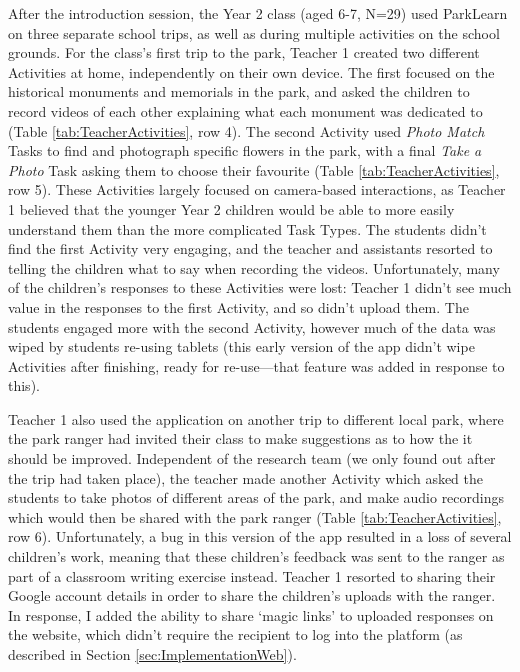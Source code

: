 After the introduction session, the Year 2 class (aged 6-7, N=29) used ParkLearn on three separate school trips, as well as during multiple activities on the school grounds. For the class's first trip to the park, Teacher 1 created two different Activities at home, independently on their own device. The first focused on the historical monuments and memorials in the park, and asked the children to record videos of each other explaining what each monument was dedicated to (Table \ref{tab:TeacherActivities}, row 4). The second Activity used \textit{Photo Match} Tasks to find and photograph specific flowers in the park, with a final \textit{Take a Photo} Task asking them to choose their favourite (Table \ref{tab:TeacherActivities}, row 5). These Activities largely focused on camera-based interactions, as Teacher 1 believed that the younger Year 2 children would be able to more easily understand them than the more complicated Task Types. The students didn't find the first Activity very engaging, and the teacher and assistants resorted to telling the children what to say when recording the videos. Unfortunately, many of the children's responses to these Activities were lost: Teacher 1 didn't see much value in the responses to the first Activity, and so didn't upload them. The students engaged more with the second Activity, however much of the data was wiped by students re-using tablets (this early version of the app didn't wipe Activities after finishing, ready for re-use---that feature was added in response to this).   

Teacher 1 also used the application on another trip to different local park, where the park ranger had invited their class to make suggestions as to how the it should be improved. Independent of the research team (we only found out after the trip had taken place), the teacher made another Activity which asked the students to take photos of different areas of the park, and make audio recordings which would then be shared with the park ranger (Table \ref{tab:TeacherActivities}, row 6). Unfortunately, a bug in this version of the app resulted in a loss of several children’s work, meaning that these children’s feedback was sent to the ranger as part of a classroom writing exercise instead. Teacher 1 resorted to sharing their Google account details in order to share the children's uploads with the ranger. In response, I added the ability to share `magic links' to uploaded responses on the website, which didn't require the recipient to log into the platform (as described in Section \ref{sec:ImplementationWeb}).

